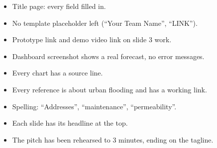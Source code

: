 \documentclass[11pt,a4paper]{article}
\begin{document}
\begin{itemize}[label=$\square$]
  \item Title page: every field filled in.
  \item No template placeholder left (``Your Team Name'', ``LINK'').
  \item Prototype link and demo video link on slide 3 work.
  \item Dashboard screenshot shows a real forecast, no error messages.
  \item Every chart has a source line.
  \item Every reference is about urban flooding and has a working link.
  \item Spelling: ``Addresses'', ``maintenance'', ``permeability''.
  \item Each slide has its headline at the top.
  \item The pitch has been rehearsed to 3 minutes, ending on the tagline.
\end{itemize}
\end{document}
